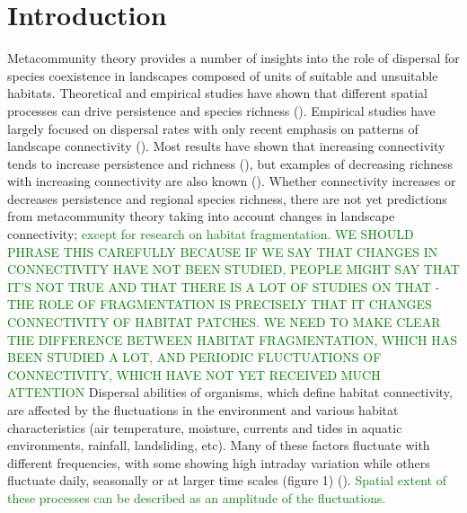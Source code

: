 \documentclass[12pt]{article}
\newcommand{\JK}[1]{\textcolor{Green}{#1}}
\begin{document}
\section*{Introduction}

Metacommunity theory provides a number of insights into the role of dispersal for species coexistence in landscapes composed of units of suitable and unsuitable habitats. Theoretical and empirical studies have shown that different spatial processes can drive persistence and species richness (\cite{Holyoaketal2005}). Empirical studies have largely focused on dispersal rates with only recent emphasis on patterns of landscape connectivity (\cite{kneitel2004, cadotte2006}). Most results have shown that increasing connectivity tends to increase persistence and richness (\cite{ellneretal2001, foxetal2011}), but examples of decreasing richness with increasing connectivity are also known (\cite{daviesetal2009, altermattetal2011}). Whether connectivity increases or decreases persistence and regional species richness, there are not yet predictions from metacommunity theory taking into account changes in landscape connectivity; \JK{except for research on habitat fragmentation. WE SHOULD PHRASE THIS CAREFULLY BECAUSE IF WE SAY THAT CHANGES IN CONNECTIVITY HAVE NOT BEEN STUDIED, PEOPLE MIGHT SAY THAT IT'S NOT TRUE AND THAT THERE IS A LOT OF STUDIES ON THAT - THE ROLE OF FRAGMENTATION IS PRECISELY THAT IT CHANGES CONNECTIVITY OF HABITAT PATCHES. WE NEED TO MAKE CLEAR THE DIFFERENCE BETWEEN HABITAT FRAGMENTATION, WHICH HAS BEEN STUDIED A LOT, AND PERIODIC FLUCTUATIONS OF CONNECTIVITY, WHICH HAVE NOT YET RECEIVED MUCH ATTENTION} Dispersal abilities of organisms, which define habitat connectivity, are affected by the fluctuations in the environment and various habitat characteristics (air temperature, moisture, currents and tides in aquatic environments, rainfall, landsliding, etc). Many of these factors fluctuate with different frequencies, with some showing high intraday variation while others fluctuate daily, seasonally or at larger time scales (figure 1) (\cite{StensethEtAl2002}). \JK{Spatial extent of these processes can be described as an amplitude of the fluctuations.}
\end{document}
